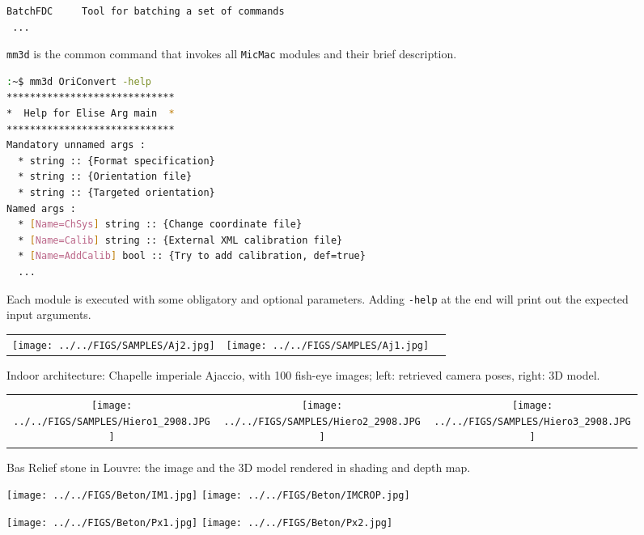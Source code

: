 \documentclass[twocolumn]{bmcart}%
\begin{document}
\begin{backmatter}
\begin{figure}[h!]
\begin{lstlisting}[language=bash,frame=none]
BatchFDC	 Tool for batching a set of commands
 ...
\end{lstlisting}
\caption{ {{\tt mm3d} is the common command that invokes all {\tt MicMac} modules and their brief description.}}\label{fig:mm3d}
\end{figure}
%
\footnotesize
\begin{figure}[h!]
\begin{lstlisting}[language=bash,frame=none]
:~$ mm3d OriConvert -help
*****************************
*  Help for Elise Arg main  *
*****************************
Mandatory unnamed args : 
  * string :: {Format specification}
  * string :: {Orientation file}
  * string :: {Targeted orientation}
Named args : 
  * [Name=ChSys] string :: {Change coordinate file}
  * [Name=Calib] string :: {External XML calibration file}
  * [Name=AddCalib] bool :: {Try to add calibration, def=true}
  ...
\end{lstlisting}
\caption{ {Each module is executed with some obligatory and optional parameters. Adding {\tt -help} at the end will print out the expected input arguments}.}\label{fig:help}
\end{figure}

\begin{figure}
 \begin{tabular}{c c c} 
 \texttt{[image: ../../FIGS/SAMPLES/Aj2.jpg]} &
 \texttt{[image: ../../FIGS/SAMPLES/Aj1.jpg]} &
  \end{tabular}
 \caption{{Indoor architecture: } Chapelle imperiale Ajaccio, with 100 fish-eye images;
 left: retrieved camera poses, right: 3D model.}\label{fig:fisheye}
 \end{figure}

\begin{figure}
 \begin{tabular}{c c c} 
    \texttt{[image: ../../FIGS/SAMPLES/Hiero1\_2908.JPG]} &
    \texttt{[image: ../../FIGS/SAMPLES/Hiero2\_2908.JPG]} &
    \texttt{[image: ../../FIGS/SAMPLES/Hiero3\_2908.JPG]} 
 \end{tabular}
 \caption{{ Bas Relief} stone in Louvre: the image and the 3D model rendered in shading and depth map.}\label{fig:basRelief}
 \end{figure}


\begin{figure}
\begin{center}
 \texttt{[image: ../../FIGS/Beton/IM1.jpg]}
 \texttt{[image: ../../FIGS/Beton/IMCROP.jpg]}
 
 \texttt{[image: ../../FIGS/Beton/Px1.jpg]}
 \texttt{[image: ../../FIGS/Beton/Px2.jpg]}
 

\end{center}
\end{figure}
\end{backmatter}
\end{document}
